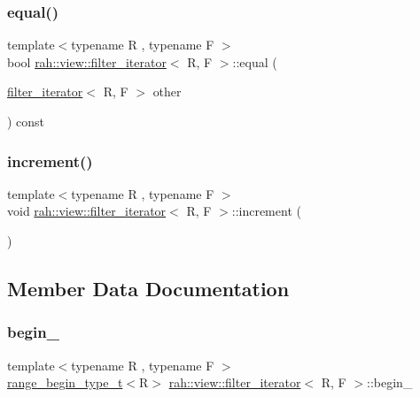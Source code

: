 \subsubsection{\texorpdfstring{equal()}{equal()}}
{\footnotesize\ttfamily template$<$typename R , typename F $>$ \\
bool \mbox{\hyperlink{structrah_1_1view_1_1filter__iterator}{rah\+::view\+::filter\+\_\+iterator}}$<$ R, F $>$\+::equal (\begin{DoxyParamCaption}\item[{\mbox{\hyperlink{structrah_1_1view_1_1filter__iterator}{filter\+\_\+iterator}}$<$ R, F $>$}]{other }\end{DoxyParamCaption}) const\hspace{0.3cm}{\ttfamily [inline]}}

\mbox{\label{structrah_1_1view_1_1filter__iterator_a63278a452be5e546e6fb3aa0b1a90bfb}} 
\subsubsection{\texorpdfstring{increment()}{increment()}}
{\footnotesize\ttfamily template$<$typename R , typename F $>$ \\
void \mbox{\hyperlink{structrah_1_1view_1_1filter__iterator}{rah\+::view\+::filter\+\_\+iterator}}$<$ R, F $>$\+::increment (\begin{DoxyParamCaption}{ }\end{DoxyParamCaption})\hspace{0.3cm}{\ttfamily [inline]}}



\subsection{Member Data Documentation}
\mbox{\label{structrah_1_1view_1_1filter__iterator_af25f988051c25994b9a6211838555a3d}} 
\subsubsection{\texorpdfstring{begin\_}{begin\_}}
{\footnotesize\ttfamily template$<$typename R , typename F $>$ \\
\mbox{\hyperlink{namespacerah_a28aff4eeddcece6be65ff0b956d32d4a}{range\+\_\+begin\+\_\+type\+\_\+t}}$<$R$>$ \mbox{\hyperlink{structrah_1_1view_1_1filter__iterator}{rah\+::view\+::filter\+\_\+iterator}}$<$ R, F $>$\+::begin\+\_\+}

